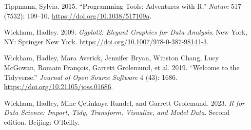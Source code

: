 \documentclass[
  letterpaper,
]{scrbook}
\newlength{\cslhangindent}
\newlength{\cslentryspacingunit} %
\newenvironment{CSLReferences}[2] %
 {%
  \setlength{\parindent}{0pt}
  \ifodd #1
  \let\oldpar\par
  \def\par{\hangindent=\cslhangindent\oldpar}
  \fi
  \setlength{\parskip}{#2\cslentryspacingunit}
 }%
 {}
\begin{document}
\begin{CSLReferences}{1}{0}
\leavevmode{}%
Tippmann, Sylvia. 2015. {``Programming Tools: {Adventures} with {R}.''}
\emph{Nature} 517 (7532): 109--10.
\url{https://doi.org/10.1038/517109a}.

\leavevmode{}%
Wickham, Hadley. 2009. \emph{Ggplot2: {Elegant Graphics} for {Data
Analysis}}. {New York, NY}: {Springer New York}.
\url{https://doi.org/10.1007/978-0-387-98141-3}.

\leavevmode{}%
Wickham, Hadley, Mara Averick, Jennifer Bryan, Winston Chang, Lucy
McGowan, Romain François, Garrett Grolemund, et al. 2019. {``Welcome to
the {Tidyverse}.''} \emph{Journal of Open Source Software} 4 (43): 1686.
\url{https://doi.org/10.21105/joss.01686}.

\leavevmode{}%
Wickham, Hadley, Mine Çetinkaya-Rundel, and Garrett Grolemund. 2023.
\emph{R for Data Science: Import, Tidy, Transform, Visualize, and Model
Data}. Second edition. {Beijing}: {O'Reilly}.

\end{CSLReferences}


\backmatter
\end{document}
